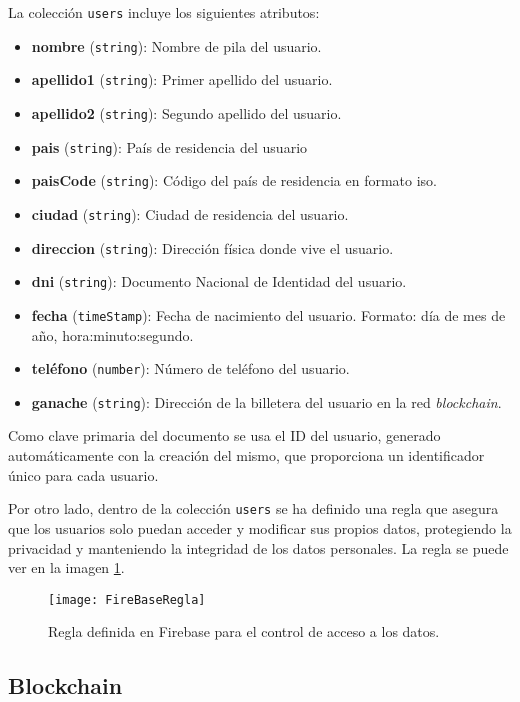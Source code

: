 La colección \texttt{users} incluye los siguientes atributos:
\begin{itemize}
 	\item \textbf{nombre} (\texttt{string}): Nombre de pila del usuario.
    \item \textbf{apellido1} (\texttt{string}): Primer apellido del
     usuario.
    \item \textbf{apellido2} (\texttt{string}): Segundo apellido del
     usuario.
    \item \textbf{pais} (\texttt{string}): País de residencia del usuario
    \item \textbf{paisCode} (\texttt{string}): Código del país de
     residencia en formato iso.
    \item \textbf{ciudad} (\texttt{string}): Ciudad de residencia del
     usuario.
    \item \textbf{direccion} (\texttt{string}): Dirección física donde vive
     el usuario.
    \item \textbf{dni} (\texttt{string}): Documento Nacional de Identidad
     del usuario.
    \item \textbf{fecha} (\texttt{timeStamp}): Fecha de nacimiento del
     usuario. Formato: día de mes de año, hora:minuto:segundo.
    \item \textbf{teléfono} (\texttt{number}): Número de teléfono del
     usuario.
    \item \textbf{ganache} (\texttt{string}): Dirección de la billetera del
     usuario en la red \textit{blockchain}.
\end{itemize}

Como clave primaria del documento se usa el ID del usuario, generado automáticamente con la creación del mismo, que proporciona un identificador único para cada usuario.

Por otro lado, dentro de la colección \texttt{users} se ha definido una regla que asegura que los usuarios solo puedan acceder y modificar sus propios datos, protegiendo la privacidad y manteniendo la integridad de los datos personales. La regla se puede ver en la imagen \ref{img:FireBaseRegla}.

\begin{figure}[h]
	\label{img:FireBaseRegla}
	\centering
	\texttt{[image: FireBaseRegla]}
	\caption[Regla Firebase]{Regla definida en Firebase para el control de acceso a los datos.}
\end{figure}


\subsection{Blockchain}

